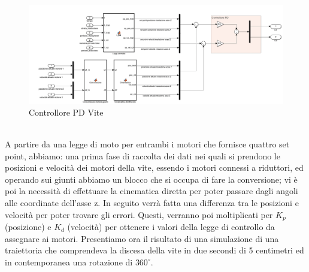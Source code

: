 \begin{figure}[ht]
	\begin{center}
		\includegraphics[scale=0.35]{Immagini/Controllori/Vite}
		\caption{Controllore PD Vite}
		\label{fig:PDVite}
	\end{center}
\end{figure}
\\A partire da una legge di moto per entrambi i motori che fornisce quattro set point, abbiamo: una prima fase di raccolta dei dati nei quali si prendono le posizioni e velocità dei motori della vite, essendo i motori connessi a riduttori, ed operando sui giunti abbiamo un blocco che si occupa di fare la conversione;  vi è poi la necessità di effettuare la cinematica diretta per poter passare dagli angoli alle coordinate dell'asse z. In seguito verrà fatta una differenza tra le posizioni e velocità per poter trovare gli errori. Questi, verranno poi moltiplicati per $K_p$ (posizione) e $K_d$ (velocità) per ottenere i valori della legge di controllo da assegnare ai motori.
Presentiamo ora il risultato di una simulazione di una traiettoria che comprendeva la discesa della vite in due secondi di 5 centimetri ed in contemporanea una rotazione di $360^\circ$.
